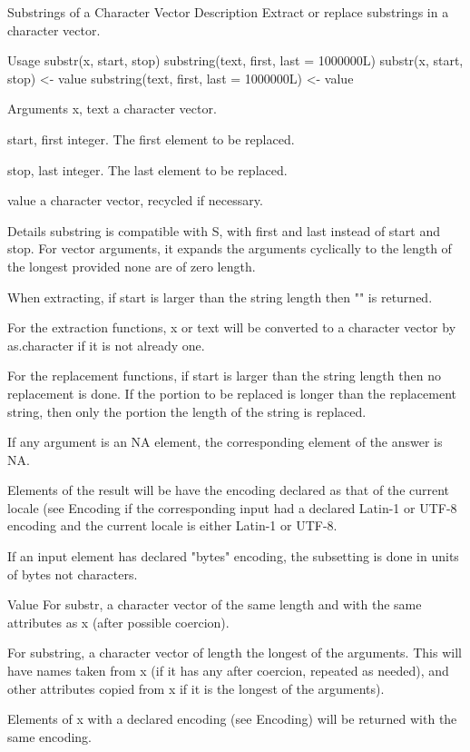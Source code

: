 Substrings of a Character Vector
Description
Extract or replace substrings in a character vector. 

Usage
substr(x, start, stop)
substring(text, first, last = 1000000L)
substr(x, start, stop) <- value
substring(text, first, last = 1000000L) <- value

Arguments
x, text a character vector.
 
start, first integer. The first element to be replaced.
 
stop, last integer. The last element to be replaced.
 
value a character vector, recycled if necessary.
 

Details
substring is compatible with S, with first and last instead of start and stop. For vector arguments, it expands the arguments cyclically to the length of the longest provided none are of zero length. 

When extracting, if start is larger than the string length then "" is returned. 

For the extraction functions, x or text will be converted to a character vector by as.character if it is not already one. 

For the replacement functions, if start is larger than the string length then no replacement is done. If the portion to be replaced is longer than the replacement string, then only the portion the length of the string is replaced. 

If any argument is an NA element, the corresponding element of the answer is NA. 

Elements of the result will be have the encoding declared as that of the current locale (see Encoding if the corresponding input had a declared Latin-1 or UTF-8 encoding and the current locale is either Latin-1 or UTF-8. 

If an input element has declared "bytes" encoding, the subsetting is done in units of bytes not characters. 

Value
For substr, a character vector of the same length and with the same attributes as x (after possible coercion). 

For substring, a character vector of length the longest of the arguments. This will have names taken from x (if it has any after coercion, repeated as needed), and other attributes copied from x if it is the longest of the arguments). 

Elements of x with a declared encoding (see Encoding) will be returned with the same encoding. 

